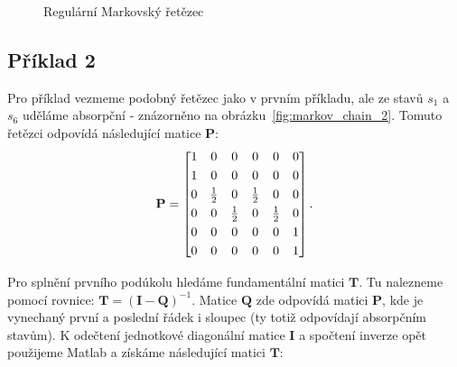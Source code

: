 \documentclass{article}
\begin{document}
\begin{figure}
\centering
{}
\caption{Regulární Markovský řetězec}
\label{fig:markov_chain_1}
    
\end{figure}
\clearpage

\subsection{Příklad 2}
Pro příklad vezmeme podobný řetězec jako v prvním příkladu, ale ze stavů $s_1$ a $s_6$ uděláme absorpční - znázorněno na obrázku~\ref{fig:markov_chain_2}.
Tomuto řetězci odpovídá následující matice $\mathbf{P}$:
\[
\mathbf{P} =
\begin{bmatrix}
1 & 0 & 0 & 0 & 0 & 0 \\
\addlinespace[3pt]
1 & 0 & 0 & 0 & 0 & 0 \\
\addlinespace[3pt]
0 & \frac{1}{2} & 0 & \frac{1}{2} & 0 & 0 \\
\addlinespace[3pt]
0 & 0 & \frac{1}{2} & 0 & \frac{1}{2} & 0 \\
\addlinespace[3pt]
0 & 0 & 0 & 0 & 0 & 1 \\
\addlinespace[3pt]
0 & 0 & 0 & 0 & 0 & 1 \\
\end{bmatrix}.
\]

Pro splnění prvního podúkolu hledáme fundamentální matici $\mathbf{T}$. Tu nalezneme pomocí rovnice: $\mathbf{T}=(\mathbf{I}-\mathbf{Q})^{-1}$. Matice $\mathbf{Q}$ zde odpovídá matici $\mathbf{P}$, kde je vynechaný první a poslední řádek i sloupec (ty totiž odpovídají absorpčním stavům).
K odečtení jednotkové diagonální matice $\mathbf{I}$ a spočtení inverze opět použijeme Matlab a získáme následující matici $\mathbf{T}$:
\end{document}

